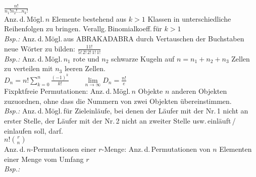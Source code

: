 \documentclass[a4paper,10pt,titlepage]{scrartcl}
\begin{document}
$\frac{n!}{n_1!n_2!\dots n_k!}$ \\
Anz.\,d.\,Mögl.\,$n$ Elemente bestehend aus $k>1$ Klassen in unterschiedliche Reihenfolgen zu bringen. Verallg.\,Binomialkoeff.\,für $k>1$\\
\emph{Bsp.:} Anz.\,d.\,Mögl.\,aus ABRAKADABRA durch Vertauschen der Buchstaben neue Wörter zu bilden: $\frac{11!}{5!\,2!\,2!\,1!\,1!}$\\
\emph{Bsp.:} Anz.\,d.\,Mögl.\,$n_1$ rote und $n_2$ schwarze Kugeln auf $n=n_1+n_2+n_3$ Zellen zu verteilen mit $n_3$ leeren Zellen.\\

$D_n=n!\sum\limits_{k=0}^{n}\frac{(-1)^k}{k!} \qquad \lim\limits_{n\to\infty}D_n=\frac{n!}{e}$\\
{\fontsize{8pt}{0pt}\selectfont Fixpktfreie Permutationen: Anz.\,d.\,Mögl.\,$n$ Objekte $n$ anderen Objekten zuzuordnen, ohne dass die Nummern von zwei Objekten übereinstimmen.}\\
\emph{Bsp.:} Anz.\,d.\,Mögl.\,für Zieleinläufe, bei denen der Läufer mit der Nr.\,1 nicht an erster Stelle, der Läufer mit der Nr.\,2 nicht an zweiter Stelle usw.\,einläuft\,/\,einlaufen soll, darf.\\

$n!\binom{r}{n}$\\
Anz.\,d.\,$n$-Permutationen einer $r$-Menge: Anz.\,d.\,Permutationen von $n$ Elementen einer Menge vom Umfang $r$\\
\emph{Bsp.:} \\
\end{document}
